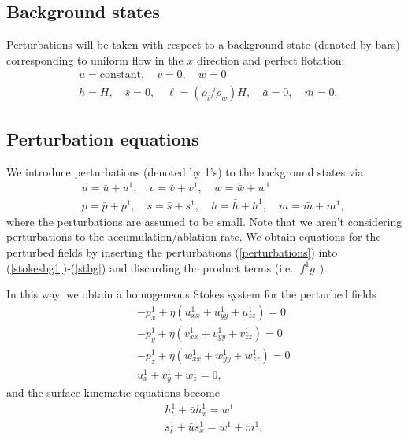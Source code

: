 \documentclass[paper=a4, fontsize=11pt]{article} %
\begin{document}
\subsection{Background states}
Perturbations will be taken with respect to a background state (denoted by bars)
corresponding to uniform flow in the $x$ direction and perfect flotation:
\begin{eqnarray}
  &&\bar{u} = \text{constant},\quad \bar{v}=0, \quad \bar{w}=0 \nonumber \\
  &&\bar{h}=H, \quad
  \bar{s}=0,\quad \bar{\ell}  = (\rho_i/\rho_w)H,\quad
  \bar{a} = 0, \quad
\bar{m} = 0.\quad
\end{eqnarray}

\subsection{Perturbation equations}
We introduce perturbations (denoted by 1's) to the background states via
\begin{eqnarray}
&&u= \bar{u} +  u^1, \quad v= \bar{v} +  v^1,\quad w =  \bar{w} + w^1 \nonumber \\
&&p = \bar{p} +  p^1,\quad s =  \bar{s} + s^1, \quad h = \bar{h} +  h^1, \quad m = \bar{m} + m^1, \label{perturbations}
\end{eqnarray}
where the perturbations are assumed to be small.
Note that we aren't considering perturbations to the accumulation/ablation rate.
We obtain equations for the perturbed fields by inserting the perturbations (\ref{perturbations}) into (\ref{stokesbg1})-(\ref{stbg})
and discarding the product terms (i.e., $f^1g^1$).

In this way, we obtain a homogeneous Stokes system for the perturbed fields
\begin{eqnarray}
&&-p_x^1 + \eta (u_{xx}^1 +u_{yy}^1+ u_{zz}^1) = 0 \label{per1} \\
&&-p_y^1 + \eta (v_{xx}^1 +v_{yy}^1+ v_{zz}^1) = 0 \\
&&-p_z^1 + \eta (w_{xx}^1 +w_{yy}^1+ w_{zz}^1) = 0\\
&&u_x^1 + v_y^1 + w_z^1 = 0, \label{per4}
\end{eqnarray}
and the surface kinematic equations become
\begin{eqnarray}
&&h_t^1 + \bar{u} h_x^1  = w^1  \label{ht} \\
&&s_t^1  + \bar{u} s_x^1 = w^1 + m^1. \label{st}
\end{eqnarray}
\end{document}

